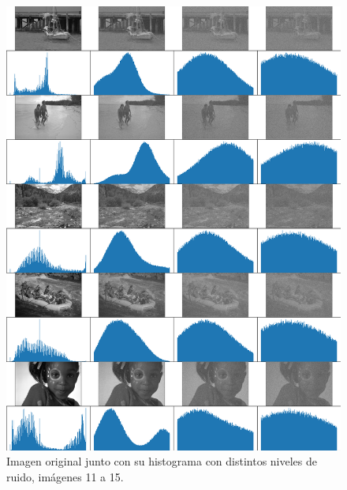 \begin{figure}
    \centering
    \includegraphics[width=\textwidth]{figuras/img_hist_noise_3.png}
    \caption{Imagen original junto con su histograma con distintos niveles de ruido, im\'agenes 11 a 15.}
\end{figure}


